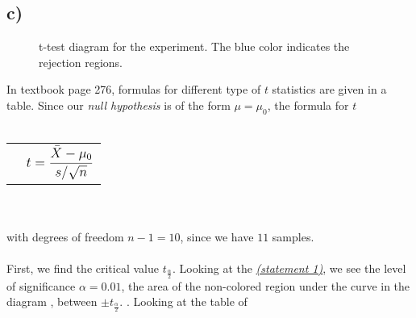 \documentclass[12pt]{article}
\begin{document}
\subsection*{c)}
\begin{figure}[h]
    \centering
        \captionsetup{labelformat=empty}
        \caption{t-test diagram for the experiment. 
        The blue color indicates the rejection regions.}
        \label{t-test}
\end{figure}
In textbook page 276, formulas for different
type of $t$ statistics are given in a table.
Since our \textit{null hypothesis} is of the form
$\mu=\mu_0$, the formula for $t$
\\ \\
\begin{tabular}{l l}
    &$\bilargeMathText{t=\frac{\bar{X}-\mu_0}{s/\sqrt{n}}}$\\
\end{tabular}
\\ \\
with degrees of freedom $n-1=10$, since we have $11$
samples.
\\ \\
First, we find the 
critical value $t_{\frac{\alpha}{2}}$. 
Looking at the \hyperlink{stat1}{\textit{(statement 1)}},
we see the level of significance $\alpha = 0.01$, the 
area of the non-colored region under the curve in the diagram
, between $\pm t_{\frac{\alpha}{2}}$.
. Looking at the table of
\end{document}
